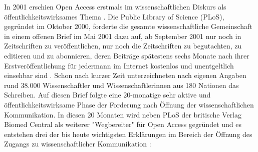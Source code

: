In 2001 erschien Open Access erstmals im wissenschaftlichen Diskurs als öffentlichkeitswirksames Thema \cite{cite:19}. Die Public Library of Science (PLoS), gegründet im Oktober 2000, forderte die gesamte wissenschaftliche Gemeinschaft in einem offenen Brief im Mai 2001 dazu auf, ab September 2001 nur noch in Zeitschriften zu veröffentlichen, nur noch die Zeitschriften zu begutachten, zu editieren und zu abonnieren, deren Beiträge spätestens sechs Monate nach ihrer Erstveröffentlichung für jedermann im Internet kostenlos und unentgeltlich einsehbar sind \cite{cite:20}. Schon nach kurzer Zeit unterzeichneten nach eigenen Angaben \cite{cite:19a} rund 38.000 Wissenschaftler und Wissenschaftlerinnen aus 180 Nationen das Schreiben. Auf diesen Brief folgte eine 20-monatige sehr aktive und öffentlichkeitswirksame Phase der Forderung nach Öffnung der wissenschaftlichen Kommunikation. In diesen 20 Monaten wird neben PLoS der britische Verlag Biomed Central als weiterer "Wegbereiter" für Open Access \cite{suchen-Hoffmann-Zugang-undVerwertung-oeffentlicher-Informationen} gegründet und es entstehen drei der bis heute wichtigsten Erklärungen im Bereich der Öffnung des Zugangs zu wissenschaftlicher Kommunikation \cite{CREATe_2014}:
